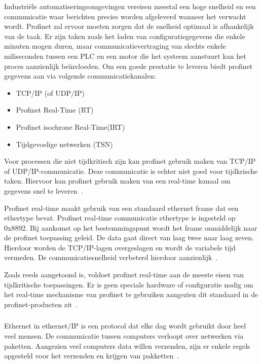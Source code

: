 Industriële automatiseringsomgevingen vereisen meestal een hoge snelheid en een communicatie waar berichten precies worden afgeleverd wanneer het verwacht wordt. Profinet zal ervoor moeten zorgen dat de snelheid optimaal is afhankelijk van de taak. Er zijn taken zoals het laden van configuratiegegevens die enkele minuten mogen duren, maar communicatievertraging van slechts enkele miliseconden tussen een PLC en een motor die het systeem aanstuurt kan het proces aanzienlijk beïnvloeden. Om een goede prestatie te leveren biedt profinet gegevens aan via volgende communicatiekanalen:
\begin{itemize}
    \item TCP/IP (of UDP/IP)
    \item Profinet Real-Time (RT)
    \item Profinet isochrone Real-Time(IRT)
    \item Tijdgevoelige netwerken (TSN)
\end{itemize}
Voor processen die niet tijdkritisch zijn kan profinet gebruik maken van TCP/IP of UDP/IP-communicatie. Deze communicatie is echter niet goed voor tijdkrische taken. Hiervoor kan profinet gebruik maken van een real-time kanaal om gegevens snel te leveren~\autocite{Nelly2021}.

Profinet real-time maakt gebruik van een standaard ethernet frame dat een ethertype bevat. Profinet real-time communicatie ethertype is ingesteld op 0x8892. Bij aankomst op het bestemmingspunt wordt het frame onmiddelijk naar de profinet toepassing geleid. De data gaat direct van laag twee naar laag zeven. Hierdoor worden de TCP/IP-lagen overgeslagen en wordt de variabele tijd vermeden. De communicatiesnelheid verbeterd hierdoor aanzienlijk~\autocite{Nelly2021}.

Zoals reeds aangetoond is, voldoet profinet real-time aan de meeste eisen van tijdkritische toepassingen. Er is geen speciale hardware of configuratie nodig om het real-time mechanisme van profinet te gebruiken aangezien dit standaard in de profinet-producten zit~\autocite{Nelly2021}.

\subsubsection{}
\label{subsubsec:EtherNet/IP}
Ethernet in ethernet/IP is een protocol dat elke dag wordt gebruikt door heel veel mensen. De communicatie tussen computers verloopt over netwerken via paketten. Aangezien veel computers data willen verzenden, zijn er enkele regels opgesteld voor het verzenden en krijgen van pakketten~\autocite{Realpars2019a}. 

